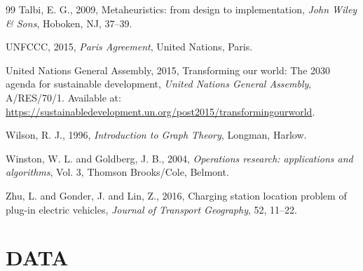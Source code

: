 \documentclass{skripsimathugm}
\begin{document}
\begin{thebibliography}{99}
Talbi, E. G., 2009, Metaheuristics: from design to implementation, \emph{John Wiley \& Sons}, Hoboken, NJ, 37--39.

UNFCCC, 2015, \emph{Paris Agreement}, United Nations, Paris.

United Nations General Assembly, 2015, Transforming our world: The 2030 agenda for sustainable development, \emph{United Nations General Assembly}, A/RES/70/1. Available at: \url{https://sustainabledevelopment.un.org/post2015/transformingourworld}.

Wilson, R. J., 1996, \emph{Introduction to Graph Theory}, Longman, Harlow.

Winston, W. L. and Goldberg, J. B., 2004, \emph{Operations research: applications and algorithms}, Vol. 3, Thomson Brooks/Cole, Belmont.

Zhu, L. and Gonder, J. and Lin, Z., 2016, Charging station location problem of plug-in electric vehicles, \emph{Journal of Transport Geography}, 52, 11--22.

\end{thebibliography}


\appendix

\chapter{DATA}
\end{document}
